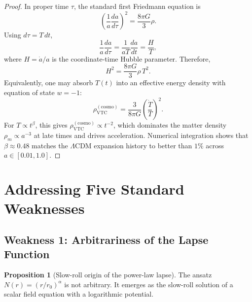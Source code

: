 \documentclass[11pt,a4paper]{article}
\theoremstyle{definition}
\newtheorem{proposition}[theorem]{Proposition}
\newcommand{\VTC}{\mathrm{VTC}}
\begin{document}
\begin{proof}
In proper time $\tau$, the standard first Friedmann equation is
\begin{equation}
    \left(\frac{1}{a}\frac{da}{d\tau}\right)^2 = \frac{8\pi G}{3}\rho.
\end{equation}
Using $d\tau=T\,dt$,
\begin{equation}
    \frac{1}{a}\frac{da}{d\tau} = \frac{1}{aT}\frac{da}{dt} = \frac{H}{T},
\end{equation}
where $H=\dot{a}/a$ is the coordinate-time Hubble parameter. Therefore,
\begin{equation}
    H^2 = \frac{8\pi G}{3}\rho\,T^2.
\end{equation}
Equivalently, one may absorb $T(t)$ into an effective energy density with equation of state $w=-1$:
\begin{equation}
    \rho_{\VTC}^{\mathrm{(cosmo)}} = \frac{3}{8\pi G}\left(\frac{\dot{T}}{T}\right)^2.
\end{equation}
For $T\propto t^{\beta}$, this gives $\rho_{\VTC}^{\mathrm{(cosmo)}}\propto t^{-2}$, which dominates the matter density $\rho_m\propto a^{-3}$ at late times and drives acceleration. Numerical integration shows that $\beta\approx 0.48$ matches the $\Lambda$CDM expansion history to better than $1\%$ across $a\in[0.01,1.0]$.
\end{proof}

\section{Addressing Five Standard Weaknesses}
\label{sec:weaknesses}

\subsection{Weakness 1: Arbitrariness of the Lapse Function}

\begin{proposition}[Slow-roll origin of the power-law lapse]
The ansatz $N(r)=(r/r_0)^\alpha$ is not arbitrary. It emerges as the slow-roll solution of a scalar field equation with a logarithmic potential.
\end{proposition}
\end{document}
